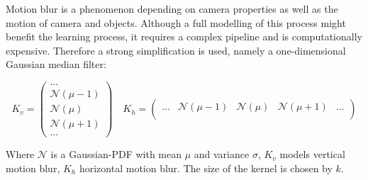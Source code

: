 Motion blur is a phenomenon depending on camera properties as well as the motion of camera and objects. Although a full modelling of this process might benefit the learning process, it requires a complex pipeline and is computationally expensive. Therefore a strong simplification is used, namely a one-dimensional Gaussian median filter:

\begin{equation}
K_v = \begin{pmatrix}
...				 \\
\mathcal{N}(\mu-1) \\
\mathcal{N}(\mu)  \\
\mathcal{N}(\mu+1)	 \\
	...					
\end{pmatrix} \quad
K_h = \begin{pmatrix}
...	& \mathcal{N}(\mu-1)	&	\mathcal{N}(\mu) &	\mathcal{N}(\mu+1) & ...\\
\end{pmatrix}
	\label{eq:motion_noise}
\end{equation}

Where $\mathcal{N}$ is a Gaussian-PDF with mean $\mu$ and variance $\sigma$,  $K_v$ models vertical motion blur, $K_h$ horizontal motion blur. The size of the kernel is chosen by $k$.

